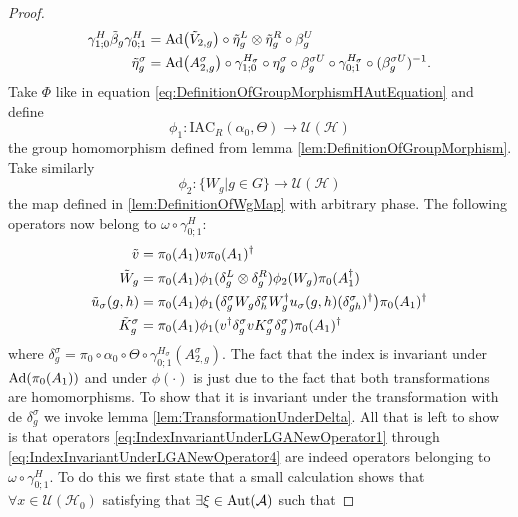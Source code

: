 \documentclass[12pt,a4paper,twoside]{article}
\newcommand{\IAC}{\textrm{IAC}}
\let\originalleft\left
\let\originalright\right
\renewcommand{\left}{\mathopen{}\mathclose\bgroup\originalleft}
\renewcommand{\right}{\aftergroup\egroup\originalright}
\newcommand{\UU}{\mathcal U}
\newcommand{\HH}{\mathcal H}
\renewcommand{\AA}{\mathcal A}
\newcommand{\Ad}[1]{\textrm{Ad}\left(#1\right)}
\newcommand{\Aut}[1]{\textrm{Aut}\left(#1\right)}
\theoremstyle{definition}
\numberwithin{equation}{section}
\begin{document}
\begin{proof}
	\begin{align}
		\label{eq:IndexInvariantUnderLGAEtaTildeDefiniton1}
		\gamma^{H}_{1;0}\tilde{\beta}_g\gamma^{H}_{0;1}&=\Ad{\tilde V_{2,g}}\circ\tilde{\eta}_g^L\otimes\tilde{\eta}_g^R\circ\beta_g^U\\
		\label{eq:IndexInvariantUnderLGAEtaTildeDefiniton2}
		\tilde{\eta}_g^\sigma&=\Ad{A_{2,g}^\sigma}\circ\gamma^{H_\sigma}_{1;0}\circ\eta_g^\sigma\circ\beta_g^{\sigma U}\circ\gamma^{H_\sigma}_{0;1}\circ(\beta_g^{\sigma U})^{-1}.
	\end{align}
	Take $\Phi$ like in equation \eqref{eq:DefinitionOfGroupMorphismHAutEquation} and define
	\begin{equation}
		\phi_1:\IAC_R(\alpha_0,\Theta) \rightarrow \UU(\HH)
	\end{equation}
	the group homomorphism defined from lemma \ref{lem:DefinitionOfGroupMorphism}. Take similarly
	\begin{equation}
		\phi_2:\{W_g|g\in G\}\rightarrow \UU(\HH)
	\end{equation}
	the map defined in \ref{lem:DefinitionOfWgMap} with arbitrary phase. The following operators now belong to $\omega\circ\gamma^{H}_{0;1}:$
	\begin{align}
		\label{eq:IndexInvariantUnderLGANewOperator1}
		\tilde{v}&=\pi_0(A_1)v\pi_0(A_1)^\dagger\\
		\label{eq:IndexInvariantUnderLGANewOperator2}
		\tilde{W}_g&=\pi_0(A_1)\phi_1(\delta^L_g\otimes\delta^R_g)\phi_2( W_g)\pi_0(A_1^\dagger)\\
		\label{eq:IndexInvariantUnderLGANewOperator3}
		\tilde u_\sigma(g,h)&=\pi_0(A_1) \phi_1\left(\delta^\sigma_g W_g\delta^\sigma_h W_g^\dagger u_\sigma(g,h)(\delta^\sigma_{gh})^\dagger\right)\pi_0(A_1)^\dagger\\
		\label{eq:IndexInvariantUnderLGANewOperator4}
		\tilde{K}_g^\sigma&=\pi_0(A_1)\phi_1(v^\dagger \delta_g^\sigma v K_g^\sigma \delta_g^\sigma) \pi_0(A_1)^\dagger
	\end{align}
	where $\delta^\sigma_g=\pi_0\circ\alpha_0\circ\Theta\circ\gamma^{H_\sigma}_{0;1}(A^\sigma_{2,g}).$ The fact that the index is invariant under $\Ad{\pi_0(A_1)}$ and under $\phi(\cdot)$ is just due to the fact that both transformations are homomorphisms. To show that it is invariant under the transformation with de $\delta^\sigma_g$ we invoke lemma \ref{lem:TransformationUnderDelta}. All that is left to show is that operators \eqref{eq:IndexInvariantUnderLGANewOperator1} through \eqref{eq:IndexInvariantUnderLGANewOperator4} are indeed operators belonging to $\omega\circ\gamma^{H}_{0;1}$. To do this we first state that a small calculation shows that $\forall x\in\UU(\HH_0)$ satisfying that $\exists\xi\in\Aut{\AA}$ such that

\end{proof}
\end{document}
